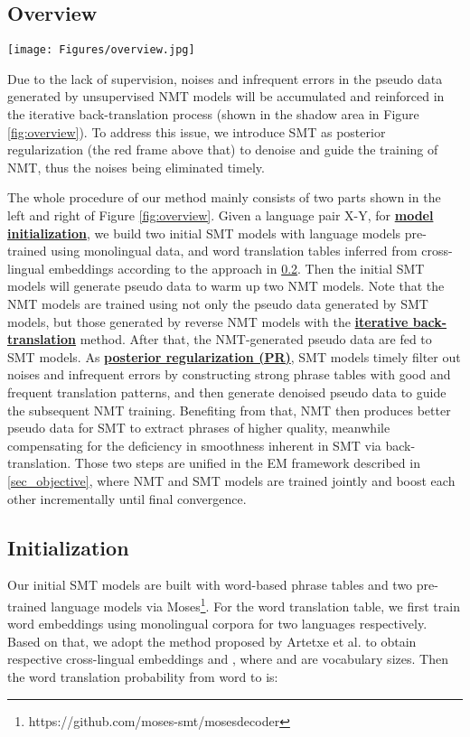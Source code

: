 \documentclass[letterpaper]{article} \usepackage{aaai19}  \usepackage{times}  \usepackage{helvet}  \usepackage{courier}  \usepackage{url}  \usepackage{graphicx}  \usepackage{amsmath}
\begin{document}
\subsection{Overview}
\label{sec_overview}

\begin{figure*}[!htb]
\centering
\texttt{[image: Figures/overview.jpg]}
\caption{Method overview. The whole procedure mainly consists of two parts as the left and the right.}
\label{fig:overview}
\end{figure*}

Due to the lack of supervision, noises and infrequent errors in the pseudo data generated by unsupervised NMT models will be accumulated and reinforced in the iterative back-translation process (shown in the shadow area in Figure \ref{fig:overview}). To address this issue, we introduce SMT as posterior regularization (the red frame above that) to denoise and guide the training of NMT, thus the noises being eliminated timely.


The whole procedure of our method mainly consists of two parts shown in the left and right of Figure \ref{fig:overview}.
Given a language pair X-Y, for \textbf{\underline{model initialization}}, we build two initial SMT models with language models pre-trained using monolingual data, and word translation tables inferred from cross-lingual embeddings according to the approach in \ref{sec_initialization}. 
Then the initial SMT models will generate pseudo data to warm up two NMT models. Note that the NMT models are trained using not only the pseudo data generated by SMT models, but those generated by reverse NMT models with the \textbf{\underline{iterative back-translation}} method. After that, the NMT-generated pseudo data are fed to SMT models. As \textbf{\underline{posterior regularization (PR)}}, SMT models timely filter out noises and infrequent errors by constructing strong phrase tables with good and frequent translation patterns, and then generate denoised pseudo data to guide the subsequent NMT training. Benefiting from that, NMT then produces better pseudo data for SMT to extract phrases of higher quality, meanwhile compensating for the deficiency in smoothness inherent in SMT via back-translation. Those two steps are unified in the EM framework described in \ref{sec_objective}, where NMT and SMT models are trained jointly and boost each other incrementally until final convergence.


\subsection{Initialization}
\label{sec_initialization}
Our initial SMT models are built with word-based phrase tables and two pre-trained language models via Moses\footnote{https://github.com/moses-smt/mosesdecoder}. For the word translation table, we first train word embeddings using monolingual corpora for two languages respectively. Based on that, we adopt the method proposed by Artetxe et al.  to obtain respective cross-lingual embeddings  and , where  and  are vocabulary sizes. Then the word translation probability from word  to  is:
\end{document}
